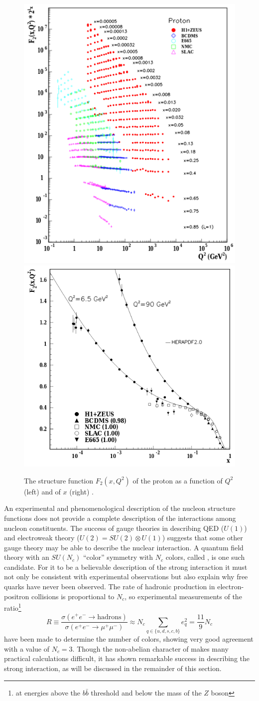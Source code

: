 \begin{figure}[t]
  \includegraphics[width=0.45\linewidth]{proton_f2.png}
  \includegraphics[width=0.54\linewidth]{proton_f2_vs_x.png}
  \caption{The structure function $F_2\left(x, Q^2\right)$ of the proton as a function of $Q^2$ (left) and of $x$ (right) \cite{Tanabashi:2018oca}.}
  \label{fig:proton_f2}
\end{figure}

An experimental and phenomenological description of the nucleon structure functions does not provide a complete description of the interactions among nucleon constituents.
The success of gauge theories in describing \ac{QED} ($U(1)$) and electroweak theory ($U(2) = SU(2) \otimes U(1)$) suggests that some other gauge theory may be able to describe the nuclear interaction.
A quantum field theory with an $SU(N_c)$ ``color'' symmetry with $N_c$ colors, called \qcd, is one such candidate.
For it to be a believable description of the strong interaction it must not only be consistent with experimental observations but also explain why free quarks have never been observed.
The rate of hadronic production in electron-positron collisions is proportional to $N_c$, so experimental measurements of the ratio\footnote{at energies above the $b\bar{b}$ threshold and below the mass of the $Z$ boson}
\begin{equation}
R \equiv \frac{\sigma\left(e^+ e^- \rightarrow \textrm{hadrons}\right)}{\sigma\left(e^+ e^- \rightarrow \mu^+ \mu^- \right)} \approx N_c \sum_{q \in \{u,d,s,c,b\}} e_q^2 = \frac{11}{9} N_c
\end{equation}
have been made to determine the number of colors, showing very good agreement with a value of $N_c = 3$.
Though the non-abelian character of \qcd makes many practical calculations difficult, it has shown remarkable success in describing the strong interaction, as will be discussed in the remainder of this section.

